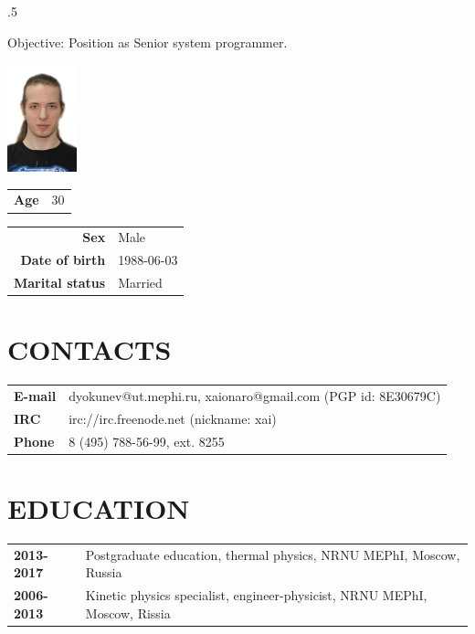 \address{115522, 2 Moskvorechie Street (building 1), Moscow, Russia}


\begin{resume}
\vspace{0.1in}
\moveleft.5\sectionwidth\centerline{Objective: Position as Senior system programmer.}

\vspace{-6.5em}
\flushright
\includegraphics[width=20mm]{photo.jpg}\\
\begin{tabular}{ll}
 {\bf Age} & 30\\
\end{tabular}
\flushleft

\vspace{-5.5em}
\begin{tabular}{rl}
 {\bf Sex}            & Male\\
 {\bf Date of birth}  & 1988-06-03\\
 {\bf Marital status} & Married\\
\end{tabular}

\section{CONTACTS}
\vspace{0.1in} 
\begin{tabular}{ll}
 {\bf E-mail} & dyokunev@ut.mephi.ru, xaionaro@gmail.com (PGP id: 8E30679C)\\
 {\bf IRC}    & irc://irc.freenode.net (nickname: xai)\\
 {\bf Phone}  & 8 (495) 788-56-99, ext. 8255\\
\end{tabular}

\section{EDUCATION}
\vspace{0.1in} 
\begin{tabular}{ll}
 {\bf 2013-2017} & Postgraduate education, thermal physics, NRNU MEPhI, Moscow, Russia\\
 {\bf 2006-2013} & Kinetic physics specialist, engineer-physicist, NRNU MEPhI, Moscow, Rissia\\
\end{tabular}


\end{resume}
